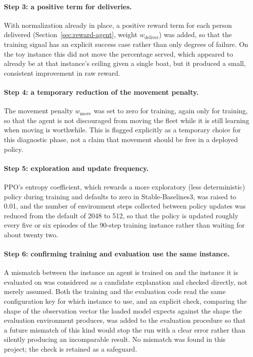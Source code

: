 \documentclass[11pt,a4paper]{article}
\begin{document}
\paragraph{Step 3: a positive term for deliveries.} With normalization already in place, a positive reward term for each person delivered (Section~\ref{sec:reward-agent}, weight $w_{\text{deliver}}$) was added, so that the training signal has an explicit success case rather than only degrees of failure. On the toy instance this did not move the percentage served, which appeared to already be at that instance's ceiling given a single boat, but it produced a small, consistent improvement in raw reward.

\paragraph{Step 4: a temporary reduction of the movement penalty.} The movement penalty $w_{\text{move}}$ was set to zero for training, again only for training, so that the agent is not discouraged from moving the fleet while it is still learning when moving is worthwhile. This is flagged explicitly as a temporary choice for this diagnostic phase, not a claim that movement should be free in a deployed policy.

\paragraph{Step 5: exploration and update frequency.} PPO's entropy coefficient, which rewards a more exploratory (less deterministic) policy during training and defaults to zero in Stable-Baselines3, was raised to 0.01, and the number of environment steps collected between policy updates was reduced from the default of 2048 to 512, so that the policy is updated roughly every five or six episodes of the 90-step training instance rather than waiting for about twenty two.

\paragraph{Step 6: confirming training and evaluation use the same instance.} A mismatch between the instance an agent is trained on and the instance it is evaluated on was considered as a candidate explanation and checked directly, not merely assumed. Both the training and the evaluation code read the same configuration key for which instance to use, and an explicit check, comparing the shape of the observation vector the loaded model expects against the shape the evaluation environment produces, was added to the evaluation procedure so that a future mismatch of this kind would stop the run with a clear error rather than silently producing an incomparable result. No mismatch was found in this project; the check is retained as a safeguard.
\end{document}
